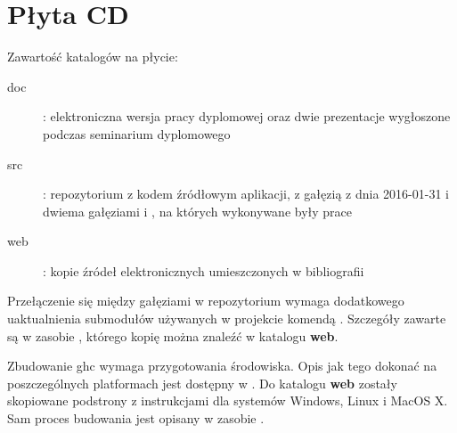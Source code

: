 \chapter{Płyta CD}\label{app:plyta}

\begin{figure}[htb]
\makebox[\textwidth]{\framebox[12.8cm]{\rule{0pt}{12.8cm}}}
\end{figure}
\pagebreak

Zawartość katalogów na płycie:
\begin{description}
    \item[doc] : elektroniczna wersja pracy dyplomowej oraz dwie prezentacje wygłoszone podczas seminarium dyplomowego
    \item[src] : repozytorium z kodem źródłowym aplikacji, z gałęzią  z dnia 2016-01-31 i dwiema gałęziami  i , na których wykonywane były prace
    \item[web] : kopie źródeł elektronicznych umieszczonych w bibliografii
\end{description}

Przełączenie się między gałęziami w repozytorium wymaga dodatkowego uaktualnienia submodułów używanych w projekcie komendą . Szczegóły zawarte są w zasobie \cite{WikiGettingTheSources}, którego kopię można znaleźć w katalogu \textbf{web}.

Zbudowanie ghc wymaga przygotowania środowiska. Opis jak tego dokonać na poszczególnych platformach jest dostępny w \cite{WikiPreparation}. Do katalogu \textbf{web} zostały skopiowane podstrony z instrukcjami dla systemów Windows, Linux i MacOS X. Sam proces budowania jest opisany w zasobie \cite{WikiNewcomers}.
